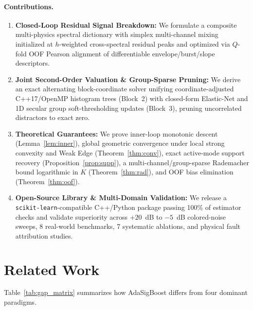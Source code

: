 \documentclass[10pt]{article}
\begin{document}
\paragraph{Contributions.}
\begin{enumerate}
    \item \textbf{Closed-Loop Residual Signal Breakdown:} We formulate a composite multi-physics spectral dictionary with simplex multi-channel mixing initialized at $h$-weighted cross-spectral residual peaks and optimized via $Q$-fold OOF Pearson alignment of differentiable envelope/burst/slope descriptors.
    \item \textbf{Joint Second-Order Valuation \& Group-Sparse Pruning:} We derive an exact alternating block-coordinate solver unifying coordinate-adjusted C++17/OpenMP histogram trees (Block~2) with closed-form Elastic-Net and 1D secular group soft-thresholding updates (Block~3), pruning uncorrelated distractors to exact zero.
    \item \textbf{Theoretical Guarantees:} We prove inner-loop monotonic descent (Lemma~\ref{lem:inner}), global geometric convergence under local strong convexity and Weak Edge (Theorem~\ref{thm:conv}), exact active-mode support recovery (Proposition~\ref{prop:supp}), a multi-channel/group-sparse Rademacher bound logarithmic in $K$ (Theorem~\ref{thm:rad}), and OOF bias elimination (Theorem~\ref{thm:oof}).
    \item \textbf{Open-Source Library \& Multi-Domain Validation:} We release a \texttt{scikit-learn}-compatible C++/Python package passing 100\% of estimator checks and validate superiority across $+20$~dB to $-5$~dB colored-noise sweeps, 8 real-world benchmarks, 7 systematic ablations, and physical fault attribution studies.
\end{enumerate}

\section{Related Work}
\label{sec:related}
Table~\ref{tab:gap_matrix} summarizes how AdaSigBoost differs from four dominant paradigms.
\end{document}
